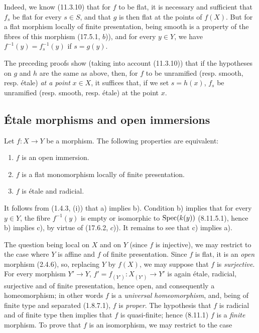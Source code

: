Indeed, we know (11.3.10) that for $f$ to be flat, it is necessary and sufficient that $f_s$ be flat for every $s\in S$, and that $g$ is then flat at the points of $f(X)$. But for a flat morphism locally of finite presentation, being smooth is a property of the fibres of this morphism (17.5.1, $b$)), and for every $y\in Y$, we have $f^{-1}(y)=f_s^{-1}(y)$ if $s=g(y)$.

\begin{remark}[17.8.3]
\label{IV.17.8.3}
The preceding proofs show (taking into account (11.3.10)) that if the hypotheses on $g$ and $h$ are the same as above, then, for $f$ to be unramified (resp. smooth, resp. étale) \emph{at a point} $x\in X$, it suffices that, if we set $s=h(x)$, $f_s$ be unramified (resp. smooth, resp. étale) at the point $x$.
\end{remark}

\subsection{Étale morphisms and open immersions}
\label{IV.17.9}

\begin{theorem}[17.9.1]
\label{IV.17.9.1}
Let $f:X\to Y$ be a morphism. The following properties are equivalent:
\begin{enumerate}
  \item[a)] $f$ is an open immersion.
  \item[b)] $f$ is a flat monomorphism locally of finite presentation.
  \item[c)] $f$ is étale and radicial.
\end{enumerate}
\end{theorem}

It follows from (1.4.3, (i)) that a) implies b). Condition b) implies that for every $y\in Y$, the fibre $f^{-1}(y)$ is empty or isomorphic to $\operatorname{Spec}(k(y))$ (8.11.5.1), hence b) implies c), by virtue of (17.6.2, $c$)). It remains to see that c) implies a).

The question being local on $X$ and on $Y$ (since $f$ is injective), we may restrict to the case where $Y$ is affine and $f$ of finite presentation. Since $f$ is flat, it is an \emph{open} morphism (2.4.6), so, replacing $Y$ by $f(X)$, we may suppose that $f$ is \emph{surjective}. For every morphism $Y'\to Y$, $f'=f_{(Y')}:X_{(Y')}\to Y'$ is again étale, radicial, surjective and of finite presentation, hence open, and consequently a homeomorphism; in other words $f$ is a \emph{universal homeomorphism}, and, being of finite type and separated (1.8.7.1), $f$ is \emph{proper}. The hypothesis that $f$ is radicial and of finite type then implies that $f$ is quasi-finite; hence (8.11.1) $f$ is a \emph{finite} morphism. To prove that $f$ is an isomorphism, we may restrict to the case

